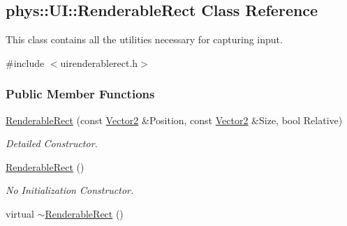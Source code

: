 \hypertarget{structphys_1_1UI_1_1RenderableRect}{
\subsection{phys::UI::RenderableRect Class Reference}
\label{structphys_1_1UI_1_1RenderableRect}
}


This class contains all the utilities necessary for capturing input.  




{\ttfamily \#include $<$uirenderablerect.h$>$}

\subsubsection*{Public Member Functions}
\begin{DoxyCompactItemize}
\item 
\hyperlink{structphys_1_1UI_1_1RenderableRect_aec033fdf803e921aff05b2c4fe40968d}{RenderableRect} (const \hyperlink{classphys_1_1Vector2}{Vector2} \&Position, const \hyperlink{classphys_1_1Vector2}{Vector2} \&Size, bool Relative)
\begin{DoxyCompactList}\small\item\em Detailed Constructor. \item\end{DoxyCompactList}\item 
\hyperlink{structphys_1_1UI_1_1RenderableRect_a601c09299852b8db35b1c4d04d22b967}{RenderableRect} ()
\begin{DoxyCompactList}\small\item\em No Initialization Constructor. \item\end{DoxyCompactList}\item 
\hypertarget{structphys_1_1UI_1_1RenderableRect_a0ee28d5ebefa8479eb54d039abe6846e}{
virtual \hyperlink{structphys_1_1UI_1_1RenderableRect_a0ee28d5ebefa8479eb54d039abe6846e}{$\sim$RenderableRect} ()}
\label{structphys_1_1UI_1_1RenderableRect_a0ee28d5ebefa8479eb54d039abe6846e}


\end{DoxyCompactItemize}
